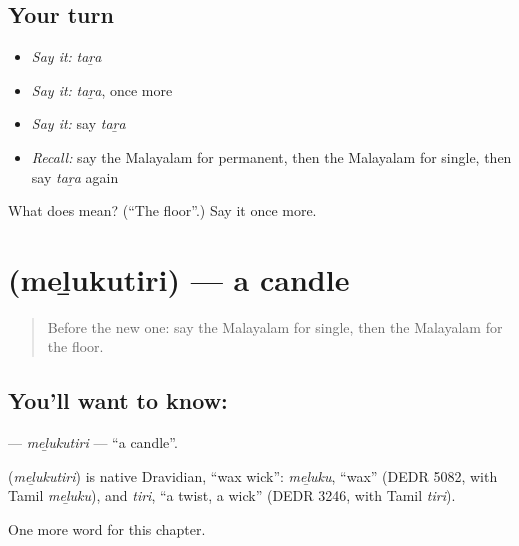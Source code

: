 \subsection*{Your turn}
\begin{itemize}
\raggedright
  \item \emph{Say it:} \emph{taṟa}
  \item \emph{Say it:} \emph{taṟa}, once more
  \item \emph{Say it:} say \emph{taṟa}
  \item \emph{Recall:} say the Malayalam for permanent, then the Malayalam for single, then say \emph{taṟa} again
\end{itemize}

\begin{tcolorbox}[breakable,colback=teal!4,colframe=teal!35!black,title={Before you move on}]
What does  mean? (\textquotedblleft{}The floor\textquotedblright{}.) Say it once more.
\end{tcolorbox}
\section[\texorpdfstring{\ml{മെഴുകുതിരി} (meḻukutiri)}{മെഴുകുതിരി (meḻukutiri)}]{ (meḻukutiri) — a candle}

\label{lesson:ML-C207-melukutiri}



\begin{quote}
Before the new one: say the Malayalam for single, then the Malayalam for the floor.
\end{quote}

\subsection*{You'll want to know: }
\textbf{} — \emph{meḻukutiri} — \textquotedblleft{}a candle\textquotedblright{}.

\begin{cousinweb}
\textbf{} (\emph{meḻukutiri}) is native Dravidian, \textquotedblleft{}wax wick\textquotedblright{}: \emph{meḻuku}, \textquotedblleft{}wax\textquotedblright{} (DEDR 5082, with Tamil \emph{meḻuku}), and \emph{tiri}, \textquotedblleft{}a twist, a wick\textquotedblright{} (DEDR 3246, with Tamil \emph{tiri}).
\end{cousinweb}

\begin{grammarlens}[title={What you've built}]
One more word for this chapter.
\end{grammarlens}

